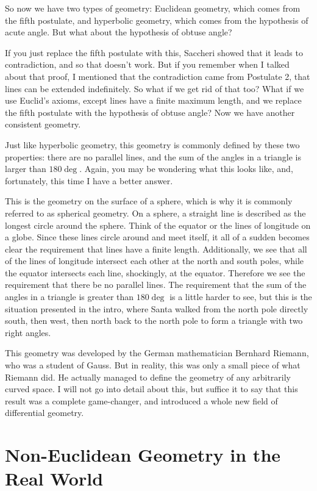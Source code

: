 \documentclass[12pt]{article}
\begin{document}
So now we have two types of geometry: Euclidean geometry, which comes from the fifth postulate, and hyperbolic geometry, which comes from the hypothesis of acute angle. But what about the hypothesis of obtuse angle?

If you just replace the fifth postulate with this, Saccheri showed that it leads to contradiction, and so that doesn't work. But if you remember when I talked about that proof, I mentioned that the contradiction came from Postulate 2, that lines can be extended indefinitely. So what if we get rid of that too? What if we use Euclid's axioms, except lines have a finite maximum length, and we replace the fifth postulate with the hypothesis of obtuse angle? Now we have another consistent geometry.

Just like hyperbolic geometry, this geometry is commonly defined by these two properties: there are no parallel lines, and the sum of the angles in a triangle is larger than $180\deg$. Again, you may be wondering what this looks like, and, fortunately, this time I have a better answer.

This is the geometry on the surface of a sphere, which is why it is commonly referred to as spherical geometry. On a sphere, a straight line is described as the longest circle around the sphere. Think of the equator or the lines of longitude on a globe. Since these lines circle around and meet itself, it all of a sudden becomes clear the requirement that lines have a finite length. Additionally, we see that all of the lines of longitude intersect each other at the north and south poles, while the equator intersects each line, shockingly, at the equator. Therefore we see the requirement that there be no parallel lines. The requirement that the sum of the angles in a triangle is greater than $180\deg$ is a little harder to see, but this is the situation presented in the intro, where Santa walked from the north pole directly south, then west, then north back to the north pole to form a triangle with two right angles.

This geometry was developed by the German mathematician Bernhard Riemann, who was a student of Gauss. But in reality, this was only a small piece of what Riemann did. He actually managed to define the geometry of any arbitrarily curved space. I will not go into detail about this, but suffice it to say that this result was a complete game-changer, and introduced a whole new field of differential geometry.

\section*{Non-Euclidean Geometry in the Real World}
\end{document}

